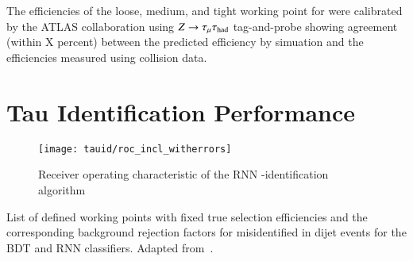 The efficiencies of the loose, medium, and tight working point for
\truetauhadvis were calibrated by the ATLAS collaboration using
$Z \to \tau_\mu \tau_{\text{had}}$ tag-and-probe showing agreement (within X
percent) between the predicted efficiency by simuation and the
efficiencies measured using collision data.


\section{Tau Identification Performance}
\label{sec:tauid_perf}

\begin{figure}[htbp]
  \centering

  \texttt{[image: tauid/roc\_incl\_witherrors]}

  \caption{Receiver operating characteristic of the RNN
    \tauhad-identification algorithm \cite{ATL-PHYS-PUB-2019-033}}%
  \label{fig:tauid_rnn_bdt_roc_comparison}
\end{figure}


\begin{table}
  \centering

  \caption{List of defined working points with fixed true \tauhadvis
    selection efficiencies and the corresponding background rejection
    factors for misidentified \tauhadvis in dijet events for the BDT
    and RNN classifiers. Adapted from~\cite{ATL-PHYS-PUB-2019-033}.}%
  \label{tab:rnn_wps}

  
\end{table}


